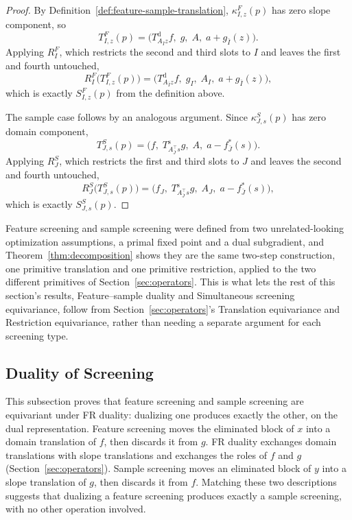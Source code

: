 \begin{proof}
By Definition~\ref{def:feature-sample-translation}, \(\kappa^F_{I,z}(p)\) has zero slope component, so
\[
T^F_{I,z}(p)
=
\bigl(T^{\mathrm d}_{A_{\bar I}z}f,\;g,\;A,\;a+g_{\bar I}(z)\bigr).
\]
Applying \(R^F_I\), which restricts the second and third slots to
\(I\) and leaves the first and fourth untouched,
\[
R^F_I\bigl(T^F_{I,z}(p)\bigr)
=
\bigl(T^{\mathrm d}_{A_{\bar I}z}f,\;g_I,\;A_I,\;a+g_{\bar I}(z)\bigr),
\]
which is exactly \(S^F_{I,z}(p)\) from the definition above.

The sample case follows by an analogous argument. Since \(\kappa^S_{J,s}(p)\)
has zero domain component,
\[
T^S_{J,s}(p)
=
\bigl(f,\;T^{\mathrm s}_{A_{\bar J}^{\top}s}g,\;A,\;a-f_{\bar J}^{*}(s)\bigr).
\]
Applying \(R^S_J\), which restricts the first and third slots to \(J\)
and leaves the second and fourth untouched,
\[
R^S_J\bigl(T^S_{J,s}(p)\bigr)
=
\bigl(f_J,\;T^{\mathrm s}_{A_{\bar J}^{\top}s}g,\;A_J,\;a-f_{\bar J}^{*}(s)\bigr),
\]
which is exactly \(S^S_{J,s}(p)\).
\end{proof}
 

Feature screening and sample screening were defined from two
unrelated-looking optimization assumptions, a primal fixed point and a
dual subgradient, and Theorem~\ref{thm:decomposition} shows they are
the same two-step construction, one primitive translation and one
primitive restriction, applied to the two different primitives of
Section~\ref{sec:operators}. This is what lets the rest of this
section's results, Feature--sample duality and Simultaneous screening
equivariance, follow from Section~\ref{sec:operators}'s Translation
equivariance and Restriction equivariance, rather than needing a
separate argument for each screening type.


\subsection{Duality of Screening}

This subsection proves that feature screening and sample screening are
equivariant under FR duality: dualizing one produces exactly the other,
on the dual representation. Feature screening moves the eliminated
block of \(x\) into a domain translation of \(f\), then discards it
from \(g\). FR duality exchanges domain translations
with slope translations and exchanges the roles of \(f\) and \(g\)
(Section~\ref{sec:operators}). Sample screening moves an eliminated
block of \(y\) into a slope translation of \(g\), then discards it
from \(f\). Matching these two descriptions suggests that dualizing a
feature screening produces exactly a sample screening, with no other
operation involved.

